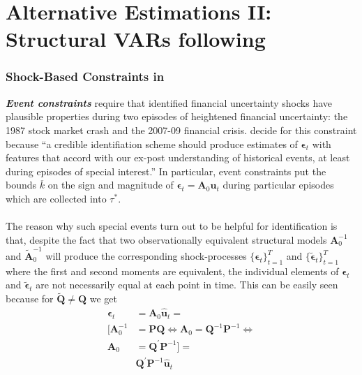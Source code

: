 \documentclass[a4paper,11pt,listof=nochaptergap,oneside,pointednumbers,bibtotoc,bigheadings,liststotoc]{scrbook}
\theoremstyle{mysatz}
\theoremstyle{mydefinition}
\theoremstyle{mybemerkung}
\renewcommand*{\paragraph}[1]{\subsubsection*{#1} \vspace{-3mm}} %
\let\oldhat\hat
\newcommand{\vect}[1]{\boldsymbol{\mathbf{#1}}}
\newcommand{\hatt}[1]{\oldhat{\boldsymbol{\mathbf{#1}}}}
\begin{document}
\section{Alternative Estimations II: Structural VARs following \citet{ludvigsonetal:18}}
\label{sec:ludvigsonetal18}





\paragraph{Shock-Based Constraints in \citet{ludvigsonetal:18}}
\textbf{\textit{Event constraints}} require that identified financial uncertainty shocks have plausible properties during two episodes of heightened financial uncertainty: the 1987 stock market crash and the 2007-09 financial crisis. \citet{ludvigsonetal:18} decide for this constraint because ``a credible identifiation scheme should produce estimates of $\vect{\epsilon}_t$ with features that accord with our ex-post understanding of historical events, at least during episodes of special interest.'' \citep[p. 7]{ludvigsonetal:18}  In particular, event constraints put the bounds $\overline{k}$ on the sign and magnitude of $\vect{\epsilon}_t = \vect{A}_0\vect{u}_t$ during particular episodes which are collected into $\tau^*$. \\
\\
The reason why such special events turn out to be helpful for identification is that, despite the fact that two observationally equivalent structural models $\vect{A}_0^{-1}$ and $\widetilde{\vect{A}}_0^{-1}$ will produce the corresponding shock-processes $\big\{\vect{\epsilon}_t\big\}_{t=1}^T$ and $\big\{\widetilde{\vect{\epsilon}}_t\big\}_{t=1}^T$ where the first and second moments are equivalent, the individual elements of $\vect{\epsilon}_t$ and $\widetilde{\vect{\epsilon}}_t$ are not necessarily equal at each point in time. This can be easily seen because for $\widetilde{\vect{Q}} \neq \vect{Q}$ we get 
\begin{equation} \label{eq:svar_ludvi9}
\begin{split}
\vect{\epsilon}_t & = \vect{A}_0\hatt{\vect{u}}_t = \\
[\vect{A}_0^{-1} & = \vect{P}\vect{Q} \iff \vect{A}_0 = \vect{Q}^{-1}\vect{P}^{-1} \iff \\
\vect{A}_0 & = \vect{Q}^{'}\vect{P}^{-1}] = \\
	& \vect{Q}^'\vect{P}^{-1}\hatt{\vect{u}}_t 
\end{split}								
\end{equation}
\end{document}
